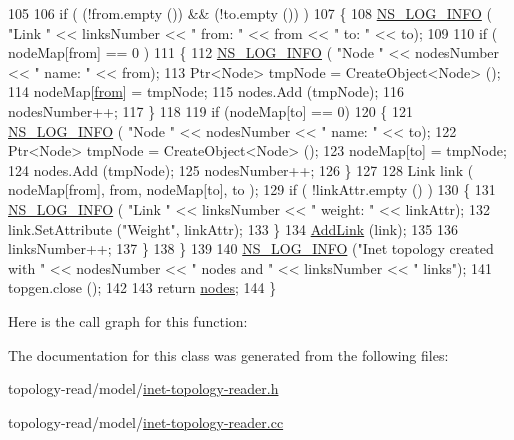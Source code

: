 \begin{DoxyCode}
105 
106       \textcolor{keywordflow}{if} ( (!from.empty ()) && (!to.empty ()) )
107         \{
108           \hyperlink{group__logging_gafbd73ee2cf9f26b319f49086d8e860fb}{NS\_LOG\_INFO} ( \textcolor{stringliteral}{"Link "} << linksNumber << \textcolor{stringliteral}{" from: "} << from << \textcolor{stringliteral}{" to: "} << to);
109 
110           \textcolor{keywordflow}{if} ( nodeMap[from] == 0 )
111             \{
112               \hyperlink{group__logging_gafbd73ee2cf9f26b319f49086d8e860fb}{NS\_LOG\_INFO} ( \textcolor{stringliteral}{"Node "} << nodesNumber << \textcolor{stringliteral}{" name: "} << from);
113               Ptr<Node> tmpNode = CreateObject<Node> ();
114               nodeMap[\hyperlink{lte__amc_8m_a1b4c81ff74eb1a626b5ade44c81004b3}{from}] = tmpNode;
115               nodes.Add (tmpNode);
116               nodesNumber++;
117             \}
118 
119           \textcolor{keywordflow}{if} (nodeMap[to] == 0)
120             \{
121               \hyperlink{group__logging_gafbd73ee2cf9f26b319f49086d8e860fb}{NS\_LOG\_INFO} ( \textcolor{stringliteral}{"Node "} << nodesNumber << \textcolor{stringliteral}{" name: "} << to);
122               Ptr<Node> tmpNode = CreateObject<Node> ();
123               nodeMap[to] = tmpNode;
124               nodes.Add (tmpNode);
125               nodesNumber++;
126             \}
127 
128           Link link ( nodeMap[from], from, nodeMap[to], to );
129           \textcolor{keywordflow}{if} ( !linkAttr.empty () )
130             \{
131               \hyperlink{group__logging_gafbd73ee2cf9f26b319f49086d8e860fb}{NS\_LOG\_INFO} ( \textcolor{stringliteral}{"Link "} << linksNumber << \textcolor{stringliteral}{" weight: "} << linkAttr);
132               link.SetAttribute (\textcolor{stringliteral}{"Weight"}, linkAttr);
133             \}
134           \hyperlink{classns3_1_1TopologyReader_a0ecbd003f3e4c0c142720b20b8cfcbeb}{AddLink} (link);
135 
136           linksNumber++;
137         \}
138     \}
139 
140   \hyperlink{group__logging_gafbd73ee2cf9f26b319f49086d8e860fb}{NS\_LOG\_INFO} (\textcolor{stringliteral}{"Inet topology created with "} << nodesNumber << \textcolor{stringliteral}{" nodes and "} << linksNumber << \textcolor{stringliteral}{"
       links"});
141   topgen.close ();
142 
143   \textcolor{keywordflow}{return} \hyperlink{visualizer-ideas_8txt_a3e1b3808014a2c68ab0cd0182e041be2}{nodes};
144 \}
\end{DoxyCode}


Here is the call graph for this function\+:




The documentation for this class was generated from the following files\+:\begin{DoxyCompactItemize}
\item 
topology-\/read/model/\hyperlink{inet-topology-reader_8h}{inet-\/topology-\/reader.\+h}\item 
topology-\/read/model/\hyperlink{inet-topology-reader_8cc}{inet-\/topology-\/reader.\+cc}\end{DoxyCompactItemize}
